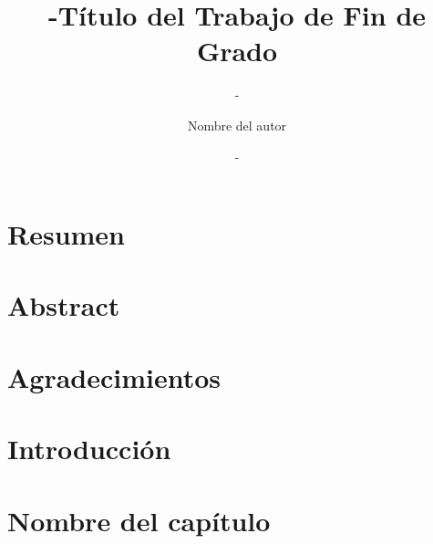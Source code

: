 \documentclass[12pt,a4paper,twoside]{book}
\title{-}
\author{-}
\date{-}
\title{Título del Trabajo de Fin de Grado}
\author{Nombre del autor}
\begin{document}
    \frontmatter {}
    
    \maketitle
    
    
    
    \chapter{Resumen}
    
    \chapter*{Abstract}
    
    
    \chapter{Agradecimientos}
    
    
    \tableofcontents
        
    \chapter{Introducción}
    

    \mainmatter

    \chapter{Nombre del capítulo}
    
    
        
    \nocite{*}
    \cleardoublepage
    
    
\end{document}

